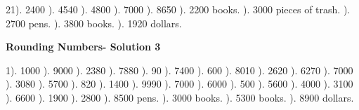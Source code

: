 \documentclass{article}%
\begin{document}
21). 2400%
). 4540%
). 4800%
). 7000%
). 8650%
). 2200 books.%
). 3000 pieces of trash.%
). 2700 pens.%
). 3800 books.%
). 1920 dollars.%
\newline%
\newpage%
\large%
\begin{center}%
\textbf{Rounding Numbers- Solution 3}%
\newline%
\end{center} \normalsize%
1). 1000%
). 9000%
). 2380%
). 7880%
). 90%
). 7400%
). 600%
). 8010%
). 2620%
). 6270%
). 7000%
). 3080%
). 5700%
). 820%
). 1400%
). 9990%
). 7000%
). 6000%
). 500%
). 5600%
). 4000%
). 3100%
). 6600%
). 1900%
). 2800%
). 8500 pens.%
). 3000 books.%
). 5300 books.%
). 8900 dollars.%
\end{document}

